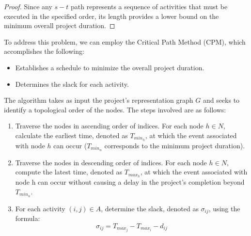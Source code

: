 \begin{proof}
    Since any $s-t$ path represents a sequence of activities that must be executed in the specified order, its length provides a lower bound on the minimum overall project duration. 
\end{proof}  
To address this problem, we can employ the Critical Path Method (CPM), which accomplishes the following:
\begin{itemize}
    \item Establishes a schedule to minimize the overall project duration.
    \item Determines the slack for each activity.
\end{itemize}
The algorithm takes as input the project's representation graph $G$ and seeks to identify a topological order of the nodes. 
The steps involved are as follows:
\begin{enumerate}
    \item Traverse the nodes in ascending order of indices.
        For each node $h \in N$, calculate the earliest time, denoted as $T_{min_h}$, at which the event associated with node $h$ can occur ($T_{min_n}$ corresponds to the minimum project duration).
    \item Traverse the nodes in descending order of indices.
        For each node $h \in N$, compute the latest time, denoted as $T_{max_h}$, at which the event associated with node h can occur without causing a delay in the project's completion beyond $T_{min_n}$.
    \item For each activity $(i,j) \in A$, determine the slack, denoted as $\sigma_{ij}$, using the formula: 
        \[\sigma_{ij}=T_{max_j}-T_{max_i}-d_{ij}\]
\end{enumerate}
